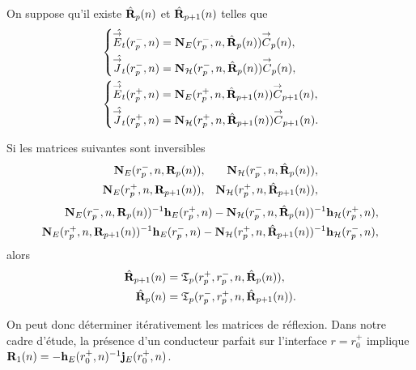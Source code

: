     \begin{prop}%
      \label{prop:sphere:synthese:reflexion}
      On suppose qu'il existe \(\hat{\mathbf{R}}_{p}(n)\) et \(\hat{\mathbf{R}}_{p+1}(n)\) telles que 
      \begin{align*}
      &\left\lbrace\begin{aligned}
        \hat{{\overset{\rightarrow}{E}}_t}(r_{p}^-,n) &= \mathbf{N}_{E}(r_p^-,n,\hat{\mathbf{R}}_{p}(n)){\overset{\rightarrow}{C}}_{p}(n),
        \\
        \hat{{\overset{\rightarrow}{J}}_t}(r_{p}^-,n) &= \mathbf{N}_{\mathcal{H}}(r_p^-,n,\hat{\mathbf{R}}_{p}(n)){\overset{\rightarrow}{C}}_{p}(n),
        \end{aligned}
      \right.
      \\
      &\left\lbrace\begin{aligned}
        \hat{{\overset{\rightarrow}{E}}_t}(r_{p}^+,n) &= \mathbf{N}_{E}(r_p^+,n,\hat{\mathbf{R}}_{p+1}(n)){\overset{\rightarrow}{C}}_{p+1}(n),
        \\
        \hat{{\overset{\rightarrow}{J}}_t}(r_{p}^+,n) &= \mathbf{N}_{\mathcal{H}}(r_p^+,n,\hat{\mathbf{R}}_{p+1}(n)){\overset{\rightarrow}{C}}_{p+1}(n).
        \end{aligned}
      \right.      
      \end{align*}

      Si les matrices suivantes sont inversibles
      \begin{align*}
        \mathbf{N}_{E}(r_p^-,n,\mathbf{R}_{p}(n)), && \mathbf{N}_{\mathcal{H}}(r_p^-,n,\hat{\mathbf{R}}_{p}(n)),
        \\
        \mathbf{N}_{E}(r_p^+,n,\mathbf{R}_{p+1}(n)), && \mathbf{N}_{\mathcal{H}}(r_p^+,n,\hat{\mathbf{R}}_{p+1}(n)),
      \end{align*}
      \begin{align*}
        \mathbf{N}_{E}(r_p^-,n,\mathbf{R}_{p}(n))^{-1}\mathbf{h}_{E}(r_p^+,n) - \mathbf{N}_{\mathcal{H}}(r_p^-,n,\hat{\mathbf{R}}_{p}(n))^{-1}\mathbf{h}_{\mathcal{H}}(r_p^+,n),
        \\
        \mathbf{N}_{E}(r_p^+,n,\mathbf{R}_{p+1}(n))^{-1}\mathbf{h}_{E}(r_p^-,n) - \mathbf{N}_{\mathcal{H}}(r_p^+,n,\hat{\mathbf{R}}_{p+1}(n))^{-1}\mathbf{h}_{\mathcal{H}}(r_p^-,n),
      \end{align*}
      alors
      \begin{align*}
        \hat{\mathbf{R}}_{p+1}(n) &= \mathfrak{T}_p(r_p^+,r_p^-,n,\hat{\mathbf{R}}_{p}(n)),
        \\
        \hat{\mathbf{R}}_{p}(n) &= \mathfrak{T}_p(r_p^-,r_p^+,n,\hat{\mathbf{R}}_{p+1}(n)).
      \end{align*}
    \end{prop}

    On peut donc déterminer itérativement les matrices de réflexion. Dans notre cadre d'étude, la présence d'un conducteur parfait sur l'interface \(r=r_0^+\) implique \(\mathbf{R}_{1}(n) = -\mathbf{h}_E(r_0^+,n)^{-1}\mathbf{j}_E(r_0^+,n)\).

